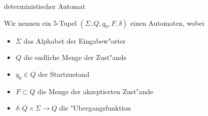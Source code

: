 \documentclass[class=article, crop=false]{standalone}
\begin{document}
\begin{zettel}{deterministischer Automat}
\begin{flashcard}
    \begin{definition}
    Wir nennen ein 5-Tupel $(\Sigma,Q, q_0,F, \delta)$ einen Automaten, wobei
\begin{itemize}
    \item $\Sigma$ das Alphabet der Eingabew"orter
    \item $Q$ die endliche Menge der Zust"ande
    \item $q_0 \in  Q$ der Startzustand
    \item $F \subset Q$ die Menge der akzeptierten Zust"ande
    \item $\delta: Q \times \Sigma \to Q$ die "Ubergangsfunktion
\end{itemize}
\end{definition}
\end{flashcard}
\end{zettel}
\end{document}
